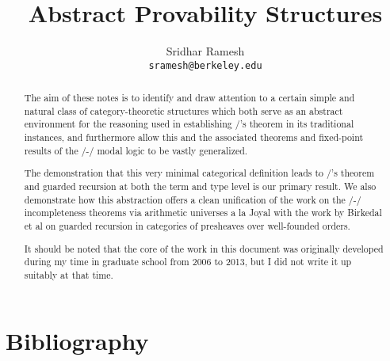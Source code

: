 \documentclass[12pt]{article}
\title{Abstract Provability Structures}
\author{
  Sridhar Ramesh\\
  \texttt{sramesh@berkeley.edu}
}
\begin{document}
\maketitle

\begin{abstract}

The aim of these notes is to identify and draw attention to a certain simple and natural class of category-theoretic structures which both serve as an abstract environment for the reasoning used in establishing \Loeb/'s theorem in its traditional instances, and furthermore allow this and the associated theorems and fixed-point results of the \Goedel/-\Loeb/ modal logic to be vastly generalized.

The demonstration that this very minimal categorical definition leads to \Loeb/'s theorem and guarded recursion at both the term and type level is our primary result. We also demonstrate how this abstraction offers a clean unification of the work on the \Godel/-\Lob/ incompleteness theorems via arithmetic universes a la Joyal with the work by Birkedal et al on guarded recursion in categories of presheaves over well-founded orders.

It should be noted that the core of the work in this document was originally developed during my time in graduate school from 2006 to 2013, but I did not write it up suitably at that time.
\end{abstract}

\newpage
{}
\setcounter{page}{1}
\tableofcontents

\setcounter{section}{-1}












\newpage \section{Bibliography}
\printbibliography

\printindex
\end{document}
